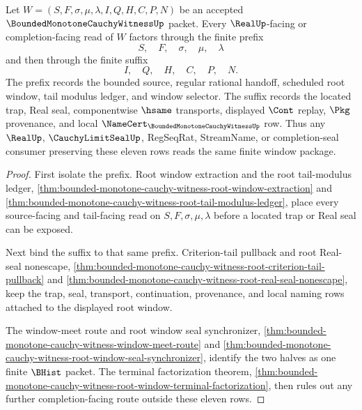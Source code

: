 \begin{theorem}
\label{thm:bounded-monotone-cauchy-witness-window-factorization}
Let $W=(S,F,\sigma,\mu,\lambda,I,Q,H,C,P,N)$ be an accepted $\BoundedMonotoneCauchyWitnessUp$ packet. Every $\RealUp$-facing or completion-facing read of $W$ factors through the finite prefix
$$
S,\quad F,\quad \sigma,\quad \mu,\quad \lambda
$$
and then through the finite suffix
$$
I,\quad Q,\quad H,\quad C,\quad P,\quad N.
$$
The prefix records the bounded source, regular rational handoff, scheduled root window, tail modulus ledger, and window selector. The suffix records the located trap, Real seal, componentwise $\hsame$ transports, displayed $\Cont$ replay, $\Pkg$ provenance, and local $\NameCert_{\BoundedMonotoneCauchyWitnessUp}$ row. Thus any $\RealUp$, $\CauchyLimitSealUp$, RegSeqRat, StreamName, or completion-seal consumer preserving these eleven rows reads the same finite window package.
\end{theorem}
\begin{proof}
First isolate the prefix. Root window extraction and the root tail-modulus ledger, \autoref{thm:bounded-monotone-cauchy-witness-root-window-extraction} and \autoref{thm:bounded-monotone-cauchy-witness-root-tail-modulus-ledger}, place every source-facing and tail-facing read on $S,F,\sigma,\mu,\lambda$ before a located trap or Real seal can be exposed.

Next bind the suffix to that same prefix. Criterion-tail pullback and root Real-seal nonescape, \autoref{thm:bounded-monotone-cauchy-witness-root-criterion-tail-pullback} and \autoref{thm:bounded-monotone-cauchy-witness-root-real-seal-nonescape}, keep the trap, seal, transport, continuation, provenance, and local naming rows attached to the displayed root window.

The window-meet route and root window seal synchronizer, \autoref{thm:bounded-monotone-cauchy-witness-window-meet-route} and \autoref{thm:bounded-monotone-cauchy-witness-root-window-seal-synchronizer}, identify the two halves as one finite $\BHist$ packet. The terminal factorization theorem, \autoref{thm:bounded-monotone-cauchy-witness-root-window-terminal-factorization}, then rules out any further completion-facing route outside these eleven rows.
\end{proof}

